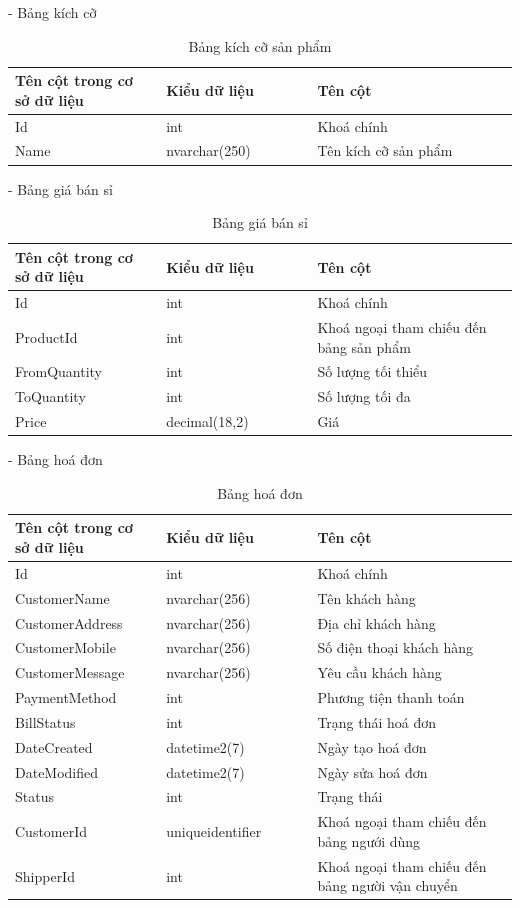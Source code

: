 - Bảng kích cỡ
\begin{longtable}[htp]{ |m{0.3\linewidth}|m{0.3\linewidth}|m{0.4\linewidth}|}
\caption{Bảng kích cỡ sản phẩm \label{database}}\\
\hline
Tên cột trong cơ sở dữ liệu & Kiểu dữ liệu & Tên cột  \\
\hline
Id&int&Khoá chính\\
\hline
Name&nvarchar(250)&Tên kích cỡ sản phẩm\\
\hline
\end{longtable}

- Bảng giá bán sỉ
\begin{longtable}[htp]{ |m{0.3\linewidth}|m{0.3\linewidth}|m{0.4\linewidth}|}
\caption{Bảng giá bán sỉ \label{database}}\\
\hline
Tên cột trong cơ sở dữ liệu & Kiểu dữ liệu & Tên cột  \\
\hline
Id&int&Khoá chính\\
\hline
ProductId&int&Khoá ngoại tham chiếu đến bảng sản phẩm\\
\hline
FromQuantity&int&Số lượng tối thiểu\\
\hline
ToQuantity&int&Số lượng tối đa\\
\hline
Price&decimal(18,2)&Giá\\
\hline
\end{longtable}

- Bảng hoá đơn
\begin{longtable}[htp]{ |m{0.3\linewidth}|m{0.3\linewidth}|m{0.4\linewidth}|}
\caption{Bảng hoá đơn\label{database}}\\
\hline
Tên cột trong cơ sở dữ liệu & Kiểu dữ liệu & Tên cột  \\
\hline
Id&int&Khoá chính\\
\hline
CustomerName&nvarchar(256)&Tên khách hàng\\
\hline
CustomerAddress&nvarchar(256)&Địa chỉ khách hàng\\
\hline
CustomerMobile&nvarchar(256)&Số điện thoại khách hàng\\
\hline
CustomerMessage&nvarchar(256)&Yêu cầu khách hàng\\
\hline
PaymentMethod&int&Phương tiện thanh toán\\
\hline
BillStatus&int&Trạng thái hoá đơn\\
\hline
DateCreated&datetime2(7)&Ngày tạo hoá đơn\\
\hline
DateModified&datetime2(7)&Ngày sửa hoá đơn\\
\hline
Status&int&Trạng thái\\
\hline
CustomerId&uniqueidentifier&Khoá ngoại tham chiếu đến bảng ngưới dùng\\
\hline
ShipperId&int&Khoá ngoại tham chiếu đến bảng người vận chuyển\\
\hline
\end{longtable}

